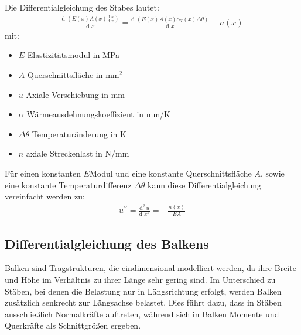 \documentclass[letterpaper,10pt,german]{jupyterBook}
\begin{document}
\sphinxAtStartPar
Die Differentialgleichung des Stabes lautet:
\begin{equation}\label{equation:chapters/chapter1/strukturgleichungen:stabdgl}
\begin{split}\frac{\text{d } \left( E(x)A(x) \frac{\text{d } u}{\text{d } x} \right) }{\text{d } x} =  \frac{\text{d } \left(E(x)A(x) \alpha_T(x) \Delta \theta\right)}{\text{d } x} - n(x)\end{split}
\end{equation}
\sphinxAtStartPar
mit:
\begin{itemize}
\item {} 
\sphinxAtStartPar
\(E\) \sphinxhyphen{} Elastizitätsmodul in MPa

\item {} 
\sphinxAtStartPar
\(A\) \sphinxhyphen{} Querschnittsfläche in mm\(^2\)

\item {} 
\sphinxAtStartPar
\(u\) \sphinxhyphen{} Axiale Verschiebung in mm

\item {} 
\sphinxAtStartPar
\(\alpha\) \sphinxhyphen{} Wärmeausdehnungskoeffizient in mm/K

\item {} 
\sphinxAtStartPar
\(\Delta \theta\) \sphinxhyphen{} Temperaturänderung in K

\item {} 
\sphinxAtStartPar
\(n\) \sphinxhyphen{} axiale Streckenlast in N/mm

\end{itemize}

\sphinxAtStartPar
Für einen konstanten \(E\)\sphinxhyphen{}Modul und eine konstante Querschnittsfläche \(A\), sowie eine konstante Temperaturdifferenz \(\Delta \theta\) kann diese Differentialgleichung vereinfacht werden zu:
\begin{equation}\label{equation:chapters/chapter1/strukturgleichungen:stabdglsimple}
\begin{split} u^{\prime \prime} = \frac{\text{d}^2\,  u  }{\text{d } x^2} =  - \frac{n(x)}{EA}\end{split}
\end{equation}

\subsection{Differentialgleichung des Balkens}
\label{\detokenize{chapters/chapter1/strukturgleichungen:differentialgleichung-des-balkens}}
\sphinxAtStartPar
Balken sind Tragstrukturen, die eindimensional modelliert werden, da ihre Breite und Höhe im Verhältnis zu ihrer Länge sehr gering sind. Im Unterschied zu Stäben, bei denen die Belastung nur in Längsrichtung erfolgt, werden Balken zusätzlich senkrecht zur Längsachse belastet. Dies führt dazu, dass in Stäben ausschließlich Normalkräfte auftreten, während sich in Balken Momente und Querkräfte als Schnittgrößen ergeben.
\end{document}
